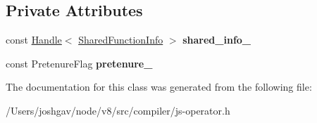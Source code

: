 \subsection*{Private Attributes}
\begin{DoxyCompactItemize}
\item 
const \hyperlink{classv8_1_1internal_1_1_handle}{Handle}$<$ \hyperlink{classv8_1_1internal_1_1_shared_function_info}{Shared\+Function\+Info} $>$ {\bfseries shared\+\_\+info\+\_\+}\hypertarget{classv8_1_1internal_1_1compiler_1_1_create_closure_parameters_ae55f897709404a209298de59a05a64d7}{}\label{classv8_1_1internal_1_1compiler_1_1_create_closure_parameters_ae55f897709404a209298de59a05a64d7}

\item 
const Pretenure\+Flag {\bfseries pretenure\+\_\+}\hypertarget{classv8_1_1internal_1_1compiler_1_1_create_closure_parameters_a854215359ba673cb929c9bf966d11db3}{}\label{classv8_1_1internal_1_1compiler_1_1_create_closure_parameters_a854215359ba673cb929c9bf966d11db3}

\end{DoxyCompactItemize}


The documentation for this class was generated from the following file\+:\begin{DoxyCompactItemize}
\item 
/\+Users/joshgav/node/v8/src/compiler/js-\/operator.\+h\end{DoxyCompactItemize}

